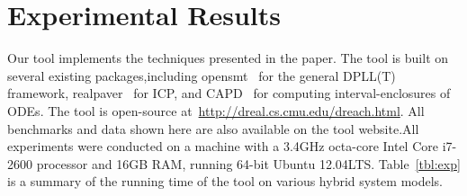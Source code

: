 \section{Experimental Results}\label{sec:exp}

Our tool \dReach{} implements the techniques presented in the
paper. The tool is built on several existing packages,including {\sf
  opensmt}~\cite{DBLP:conf/tacas/BruttomessoPST10} for the general
DPLL(T) framework, {\sf
  realpaver}~\cite{DBLP:journals/toms/GranvilliersB06} for ICP, and
{\sf CAPD}~\cite{capd} for computing interval-enclosures of ODEs. The
tool is open-source at~\url{http://dreal.cs.cmu.edu/dreach.html}. All
benchmarks and data shown here are also available on the tool
website.All experiments were conducted on a machine with a 3.4GHz
octa-core Intel Core i7-2600 processor and 16GB RAM, running 64-bit
Ubuntu 12.04LTS. Table~\ref{tbl:exp} is a summary of the running time
of the tool on various hybrid system models.

